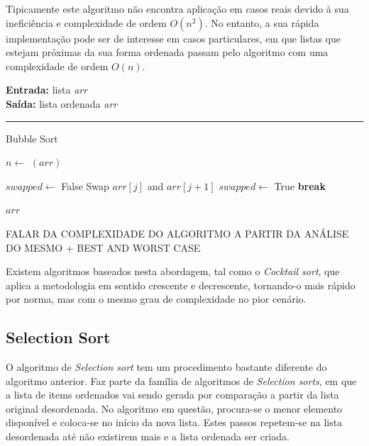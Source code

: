\documentclass[conference]{IEEEtran}
\begin{document}
Tipicamente este algoritmo não encontra aplicação em casos reais devido à sua ineficiência e complexidade de ordem \(O(n^2)\). No entanto, a sua rápida implementação pode ser de interesse em casos particulares, em que listas que estejam próximas da sua forma ordenada passam pelo algoritmo com uma complexidade de ordem \(O(n)\).

\begin{algorithm}[H]
    \raggedright
    \vspace{.1em}
    \textbf{Entrada:} lista \textit{arr} \\
    \textbf{Saída:} lista ordenada \textit{arr} \\
    \vspace{.5em}
    \hrule 
    \caption{Bubble Sort}
    \begin{algorithmic}[1]
        \State $n \gets$ $(arr)$
        
            \State $swapped \gets$ False
                    \State Swap $arr[j]$ and $arr[j+1]$
                    \State $swapped \gets$ True
                \EndIf
            \EndFor
                \State \textbf{break}
            \EndIf
        \EndFor
    
        \State \Return $arr$
    \end{algorithmic}
\end{algorithm}

FALAR DA COMPLEXIDADE DO ALGORITMO A PARTIR DA ANÁLISE DO MESMO + BEST AND WORST CASE

Existem algoritmos baseados nesta abordagem, tal como o \textit{Cocktail sort}, que aplica a metodologia em sentido crescente e decrescente, tornando-o mais rápido por norma, mas com o mesmo grau de complexidade no pior cenário.

\subsection{Selection Sort}

O algoritmo de \textit{Selection sort} tem um procedimento bastante diferente do algoritmo anterior. Faz parte da família de algoritmos de \textit{Selection sorts}, em que a lista de items ordenados vai sendo gerada por comparação a partir da lista original desordenada. No algoritmo em questão, procura-se o menor elemento disponível e coloca-se no início da nova lista. Estes passos repetem-se na lista desordenada até não existirem mais e a lista ordenada ser criada.
\end{document}
